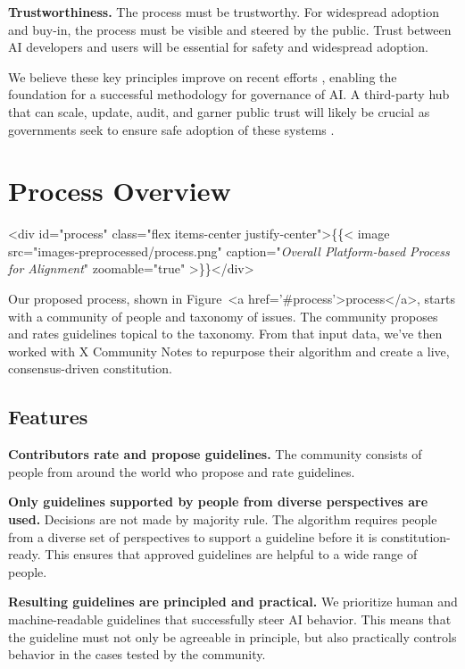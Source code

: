 \documentclass{article}
\begin{document}
\begin{multicols}{2}
\textbf{Trustworthiness.}
The process must be trustworthy. For widespread adoption and buy-in, the process must be visible and steered by the public. Trust between AI developers and users will be essential for safety and widespread adoption.

We believe these key principles improve on recent efforts \cite{collectiveConst, deepmind}, enabling the foundation for a successful methodology for governance of AI. A third-party hub that can scale, update, audit, and garner public trust will likely be crucial as governments seek to ensure safe adoption of these systems \cite{brundage2020toward}.

\section{Process Overview}
<div id="process" class="flex items-center justify-center">\{\{< image src="images-preprocessed/process.png" caption="\textit{Overall Platform-based Process for Alignment}" zoomable="true" >\}\}</div>



Our proposed process, shown in Figure~<a href='#process'>process</a>, starts with a community of people and taxonomy of issues. The community proposes and rates guidelines topical to the taxonomy. From that input data, we’ve then worked with X Community Notes to repurpose their algorithm and create a live, consensus-driven constitution. 

\subsection{Features}

\textbf{Contributors rate and propose guidelines.} The community consists of people from around the world who propose and rate guidelines.

\textbf{Only guidelines supported by people from diverse perspectives are used.} Decisions are not made by majority rule. The algorithm requires people from a diverse set of perspectives to support a guideline before it is constitution-ready. This ensures that approved guidelines are helpful to a wide range of people.

\textbf{Resulting guidelines are principled and practical.} We prioritize human and machine-readable guidelines that successfully steer AI behavior. This means that the guideline must not only be agreeable in principle, but also practically controls behavior in the cases tested by the community. 


\end{multicols}
\end{document}
